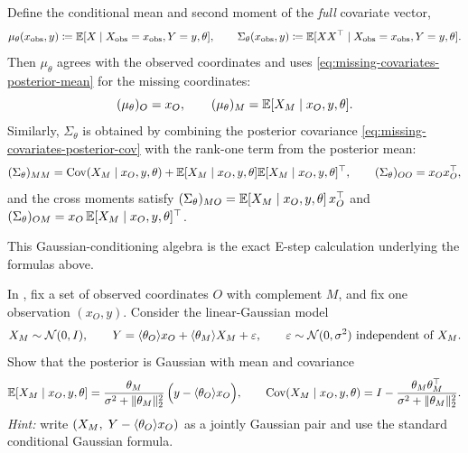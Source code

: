 \documentclass[11pt]{article}
\newif\ifshowsolutions
\newcommand{\SolutionBox}[2][10]{%
  \ifshowsolutions
    \begin{tcolorbox}[stat221panelgray,title={Solution}]
    #2
    \end{tcolorbox}
  \else
    \begin{tcolorbox}[stat221panelgray,unbreakable,title={Workspace}]
    \vspace{#1\baselineskip}
    \end{tcolorbox}
  \fi
}
\begin{document}
Define the conditional mean and second moment of the \emph{full} covariate vector,
\[
\mu_\theta(x_{\mathrm{obs}},y)\coloneqq \mathbb{E}[X\mid X_{\mathrm{obs}}=x_{\mathrm{obs}},Y=y,\theta],
\qquad
\Sigma_\theta(x_{\mathrm{obs}},y)\coloneqq \mathbb{E}[XX^\top\mid X_{\mathrm{obs}}=x_{\mathrm{obs}},Y=y,\theta].
\]
Then $\mu_\theta$ agrees with the observed coordinates and uses \eqref{eq:missing-covariates-posterior-mean} for the missing coordinates:
\[
(\mu_\theta)_O = x_O,
\qquad
(\mu_\theta)_M = \mathbb{E}[X_M\mid x_O,y,\theta].
\]
Similarly, $\Sigma_\theta$ is obtained by combining the posterior covariance \eqref{eq:missing-covariates-posterior-cov} with the rank-one term from the posterior mean:
\[
(\Sigma_\theta)_{MM}
=
\mathrm{Cov}(X_M\mid x_O,y,\theta) + \mathbb{E}[X_M\mid x_O,y,\theta]\mathbb{E}[X_M\mid x_O,y,\theta]^\top,
\qquad
(\Sigma_\theta)_{OO}=x_Ox_O^\top,
\]
and the cross moments satisfy $(\Sigma_\theta)_{MO}=\mathbb{E}[X_M\mid x_O,y,\theta]\,x_O^\top$ and $(\Sigma_\theta)_{OM}=x_O\,\mathbb{E}[X_M\mid x_O,y,\theta]^\top$.

\clearpage
This Gaussian-conditioning algebra is the exact E-step calculation underlying the formulas above.
\begin{exercise}
\label{ex:missing-covariates-estep}
In , fix a set of observed coordinates $O$ with complement $M$, and fix one observation $(x_O,y)$.
Consider the linear-Gaussian model
\[
X_M\sim\mathcal{N}(0,I),
\qquad
Y=\langle\theta_O\rangle{x_O}+\langle\theta_M\rangle{X_M}+\varepsilon,
\qquad
\varepsilon\sim\mathcal{N}(0,\sigma^2)\ \text{independent of }X_M.
\]
Show that the posterior is Gaussian with mean and covariance
\[
\mathbb{E}[X_M\mid x_O,y,\theta]=\frac{\theta_M}{\sigma^2+\lVert\theta_M\rVert_2^2}\,\Big(y-\langle\theta_O\rangle{x_O}\Big),
\qquad
\mathrm{Cov}(X_M\mid x_O,y,\theta)=I-\frac{\theta_M\theta_M^\top}{\sigma^2+\lVert\theta_M\rVert_2^2}.
\]
\emph{Hint:} write $(X_M,\;Y-\langle\theta_O\rangle{x_O})$ as a jointly Gaussian pair and use the standard conditional Gaussian formula.
\end{exercise}

\SolutionBox[18]{%
This is the standard conditional-Gaussian calculation behind the E-step.
Define the centered scalar $\tilde Y\coloneqq Y-\ip{\theta_O}{x_O}=\ip{\theta_M}{X_M}+\varepsilon$.
Then $(X_M,\tilde Y)$ is jointly Gaussian with
\[
\E[X_M]=0,
\qquad
\E[\tilde Y]=0,
\qquad
\mathrm{Cov}(X_M)=I.
\]
Moreover,
\[
\mathrm{Cov}(X_M,\tilde Y)
=
\E[X_M(\theta_M^\top X_M+\varepsilon)]
=
\E[X_M X_M^\top]\theta_M
=\theta_M,
\]
and
\[
\mathrm{Var}(\tilde Y)
=
\mathrm{Var}(\theta_M^\top X_M)+\mathrm{Var}(\varepsilon)
=
\norm{\theta_M}_2^2+\sigma^2.
\]
For a jointly Gaussian pair $(U,V)$ with $\mathrm{Var}(V)>0$, the conditional law is
\[
U\mid(V=v)\sim \mathcal{N}\!\left(\mathrm{Cov}(U,V)\,\mathrm{Var}(V)^{-1}v,\;\mathrm{Cov}(U)-\mathrm{Cov}(U,V)\,\mathrm{Var}(V)^{-1}\mathrm{Cov}(V,U)\right).
\]
Apply this with $U=X_M$ and $V=\tilde Y$ to obtain
\[
\E[X_M\mid \tilde Y=\tilde y]=\frac{\theta_M}{\sigma^2+\norm{\theta_M}_2^2}\,\tilde y,
\qquad
\mathrm{Cov}(X_M\mid \tilde Y)=I-\frac{\theta_M\theta_M^\top}{\sigma^2+\norm{\theta_M}_2^2}.
\]
Substitute $\tilde y=y-\ip{\theta_O}{x_O}$ to match \eqref{eq:missing-covariates-posterior-mean}--\eqref{eq:missing-covariates-posterior-cov}.%
}
\end{document}
